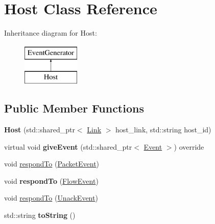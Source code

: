 \hypertarget{classHost}{\section{\-Host \-Class \-Reference}
\label{classHost}
}
\-Inheritance diagram for \-Host\-:\begin{figure}[H]
\begin{center}
\leavevmode
\includegraphics[height=2.000000cm]{classHost}
\end{center}
\end{figure}
\subsection*{\-Public \-Member \-Functions}
\begin{DoxyCompactItemize}
\item 
\hypertarget{classHost_afde96dd6239594d91697006a850bea5b}{{\bfseries \-Host} (std\-::shared\-\_\-ptr$<$ \hyperlink{classLink}{\-Link} $>$ host\-\_\-link, std\-::string host\-\_\-id)}\label{classHost_afde96dd6239594d91697006a850bea5b}

\item 
\hypertarget{classHost_a658a8bee30dfb9e6ff7abc26620f88ff}{virtual void {\bfseries give\-Event} (std\-::shared\-\_\-ptr$<$ \hyperlink{classEvent}{\-Event} $>$) override}\label{classHost_a658a8bee30dfb9e6ff7abc26620f88ff}

\item 
void \hyperlink{classHost_a28da4a1168cd8ce7c396f0ba5ced1c66}{respond\-To} (\hyperlink{classPacketEvent}{\-Packet\-Event})
\item 
\hypertarget{classHost_adbd4abe19840d56b09499af1158d6081}{void {\bfseries respond\-To} (\hyperlink{classFlowEvent}{\-Flow\-Event})}\label{classHost_adbd4abe19840d56b09499af1158d6081}

\item 
void \hyperlink{classHost_a64221eb13d89a1bb84f1eb351bc45be4}{respond\-To} (\hyperlink{classUnackEvent}{\-Unack\-Event})
\item 
\hypertarget{classHost_aa807c50f690bd2018265504483440c7d}{std\-::string {\bfseries to\-String} ()}\label{classHost_aa807c50f690bd2018265504483440c7d}

\end{DoxyCompactItemize}
